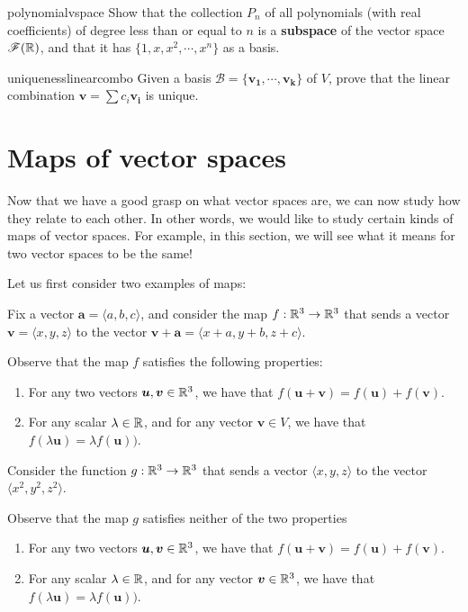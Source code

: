\begin{problem}{polynomialvspace}
Show that the collection $P_n$ of all polynomials (with real coefficients) of degree less than or equal to $n$ is a \textbf{subspace} of the vector space $\mathscr{F}(\mathbb{R})$, and that it has $\{1, x, x^2, \cdots, x^n\}$ as a basis.
\end{problem}

\begin{problem}{uniquenesslinearcombo}
Given a basis $\mathscr{B} = \{\bm{v_1}, \cdots, \bm{v_k}\}$ of $V$, prove that the linear combination $\bm{v} = \sum c_i \bm{v_i}$ is unique.
\end{problem}


\section{Maps of vector spaces}

Now that we have a good grasp on what vector spaces are, we can now study how they relate to each other.  In other words, we would like to study certain kinds of maps of vector spaces.  For example, in this section, we will see what it means for two vector spaces to be the same!  

Let us first consider two examples of maps:

\begin{example}
Fix a vector $\bm{a} = \langle a, b, c \rangle$, and consider the map $f: \mathbb{R}^3 \to \mathbb{R}^3$ that sends a vector $\bm{v} = \langle x, y, z \rangle$ to the vector $\bm{v} + \bm{a} = \langle x +a, y+b, z + c \rangle$.

Observe that the map $f$ satisfies the following properties:
\begin{enumerate}[label=(\roman*)]
        \item For any two vectors $\bm{u}, \bm{v} \in \mathbb{R}^3$, we have that $f(\bm{u}+ \bm{v}) = f(\bm{u}) + f(\bm{v})$.
        \item For any scalar $\lambda \in \mathbb{R}$, and for any vector $\bm{v} \in V$, we have that $f(\lambda \bm{u}) = \lambda f(\bm{u}))$.
    \end{enumerate}

\end{example}

\begin{example}
Consider the function $g: \mathbb{R}^3 \to \mathbb{R}^3$ that sends a vector $\langle x, y, z \rangle$ to the vector $\langle x^2, y^2, z^2 \rangle$.

Observe that the map $g$ satisfies neither of the two properties
    \begin{enumerate}[label=(\roman*)]
        \item For any two vectors $\bm{u}, \bm{v} \in \mathbb{R}^3$, we have that $f(\bm{u}+ \bm{v}) = f(\bm{u}) + f(\bm{v})$.
        \item For any scalar $\lambda \in \mathbb{R}$, and for any vector $\bm{v} \in \mathbb{R}^3$, we have that $f(\lambda \bm{u}) = \lambda f(\bm{u}))$.
    \end{enumerate}
\end{example}

